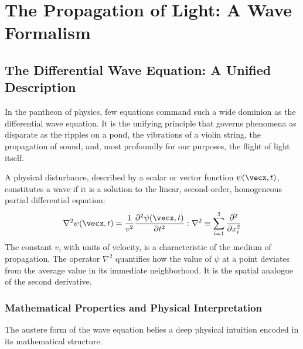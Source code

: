 \chapter{The Propagation of Light: A Wave Formalism}

\section{The Differential Wave Equation: A Unified Description}

In the pantheon of physics, few equations command such a wide dominion as the differential wave equation. It is the unifying principle that governs phenomena as disparate as the ripples on a pond, the vibrations of a violin string, the propagation of sound, and, most profoundly for our purposes, the flight of light itself.

\begin{theorem}
A physical disturbance, described by a scalar or vector function $\psi(\vecx, t)$, constitutes a wave if it is a solution to the linear, second-order, homogeneous partial differential equation:
$$ \nabla^2 \psi(\vecx, t) = \frac{1}{v^2} \frac{\partial^2 \psi(\vecx, t)}{\partial t^2} : \nabla^2 \equiv \sum_{i=1}^{3} \frac{\partial^2}{\partial x_i^2} $$
The constant $v$, with units of velocity, is a characteristic of the medium of propagation. The operator $\nabla^2$ quantifies how the value of $\psi$ at a point deviates from the average value in its immediate neighborhood. It is the spatial analogue of the second derivative.
\end{theorem}

\subsection{Mathematical Properties and Physical Interpretation}
The austere form of the wave equation belies a deep physical intuition encoded in its mathematical structure.

